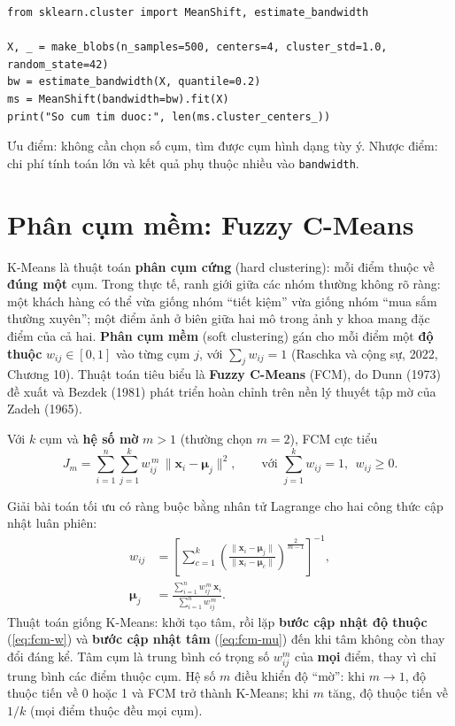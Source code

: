 \begin{lstlisting}[caption={Mean-shift với ước lượng bandwidth}]
from sklearn.cluster import MeanShift, estimate_bandwidth

X, _ = make_blobs(n_samples=500, centers=4, cluster_std=1.0, random_state=42)
bw = estimate_bandwidth(X, quantile=0.2)
ms = MeanShift(bandwidth=bw).fit(X)
print("So cum tim duoc:", len(ms.cluster_centers_))
\end{lstlisting}

Ưu điểm: không cần chọn số cụm, tìm được cụm hình dạng tùy ý. Nhược điểm: chi phí tính toán lớn và kết quả phụ thuộc nhiều vào \texttt{bandwidth}.

\section{Phân cụm mềm: Fuzzy C-Means}
\label{sec:fcm}

K-Means là thuật toán \textbf{phân cụm cứng} (hard clustering): mỗi điểm thuộc về \textbf{đúng một} cụm. Trong thực tế, ranh giới giữa các nhóm thường không rõ ràng: một khách hàng có thể vừa giống nhóm ``tiết kiệm'' vừa giống nhóm ``mua sắm thường xuyên''; một điểm ảnh ở biên giữa hai mô trong ảnh y khoa mang đặc điểm của cả hai. \textbf{Phân cụm mềm} (soft clustering) gán cho mỗi điểm một \textbf{độ thuộc} $w_{ij} \in [0, 1]$ vào từng cụm $j$, với $\sum_{j} w_{ij} = 1$ (Raschka và cộng sự, 2022, Chương 10). Thuật toán tiêu biểu là \textbf{Fuzzy C-Means} (FCM), do Dunn (1973) đề xuất và Bezdek (1981) phát triển hoàn chỉnh trên nền lý thuyết tập mờ của Zadeh (1965).

\begin{definition}
Với $k$ cụm và \textbf{hệ số mờ} $m > 1$ (thường chọn $m = 2$), FCM cực tiểu
\begin{equation}
    J_m = \sum_{i=1}^{n}\sum_{j=1}^{k} w_{ij}^{\,m}\,\big\|\mathbf{x}_i - \boldsymbol{\mu}_j\big\|^2,
    \qquad \text{với } \sum_{j=1}^{k} w_{ij} = 1,\ \ w_{ij} \geq 0 .
\end{equation}
\end{definition}

Giải bài toán tối ưu có ràng buộc bằng nhân tử Lagrange cho hai công thức cập nhật luân phiên:
\begin{align}
    w_{ij} &= \left[\sum_{c=1}^{k}\left(\frac{\|\mathbf{x}_i - \boldsymbol{\mu}_j\|}{\|\mathbf{x}_i - \boldsymbol{\mu}_c\|}\right)^{\frac{2}{m - 1}}\right]^{-1}, \label{eq:fcm-w}\\
    \boldsymbol{\mu}_j &= \frac{\sum_{i=1}^{n} w_{ij}^{\,m}\,\mathbf{x}_i}{\sum_{i=1}^{n} w_{ij}^{\,m}} . \label{eq:fcm-mu}
\end{align}
Thuật toán giống K-Means: khởi tạo tâm, rồi lặp \textbf{bước cập nhật độ thuộc} (\ref{eq:fcm-w}) và \textbf{bước cập nhật tâm} (\ref{eq:fcm-mu}) đến khi tâm không còn thay đổi đáng kể. Tâm cụm là trung bình có trọng số $w_{ij}^m$ của \textbf{mọi} điểm, thay vì chỉ trung bình các điểm thuộc cụm. Hệ số $m$ điều khiển độ ``mờ'': khi $m \to 1$, độ thuộc tiến về 0 hoặc 1 và FCM trở thành K-Means; khi $m$ tăng, độ thuộc tiến về $1/k$ (mọi điểm thuộc đều mọi cụm).

